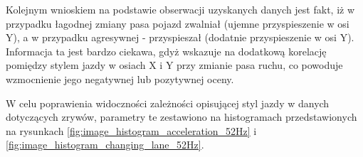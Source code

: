 Kolejnym wnioskiem na podstawie obserwacji uzyskanych danych jest fakt, iż w przypadku łagodnej zmiany pasa pojazd zwalniał (ujemne przyspieszenie w osi Y), a w przypadku agresywnej - przyspieszał (dodatnie przyspieszenie w osi Y). Informacja ta jest bardzo ciekawa, gdyż wskazuje na dodatkową korelację pomiędzy stylem jazdy w osiach X i Y przy zmianie pasa ruchu, co powoduje wzmocnienie jego negatywnej lub pozytywnej oceny.

W celu poprawienia widoczności zależności opisującej styl jazdy w danych dotyczących zrywów, parametry te zestawiono na histogramach przedstawionych na rysunkach \ref{fig:image_histogram_acceleration_52Hz} i \ref{fig:image_histogram_changing_lane_52Hz}.



\pagebreak


